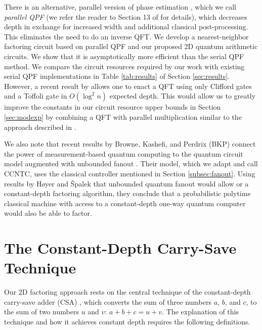 There is an alternative, parallel version of phase estimation 
\cite{Cleve2000,Kitaev2002}, which we call \emph{parallel QPF} (we refer the reader to Section 13 of \cite{Kitaev2002} for details), which decreases depth in exchange
for increased width and additional classical post-processing.
This eliminates the need to do an inverse QFT.
We develop a nearest-neighbor factoring circuit based on parallel QPF and our proposed 2D quantum arithmetic circuits.
We show that it is asymptotically more efficient than the serial QPF method. 
We compare the circuit resources required by our work with existing serial QPF implementations in Table
\ref{tab:results} of Section \ref{sec:results}.
However, a recent result by \cite{Jones2013} allows one to enact a
QFT using only Clifford gates and a Toffoli gate in $O(\log^2 n)$ expected depth.
This would allow us to
greatly improve the constants in our circuit resource upper bounds in Section \ref{sec:modexp} by combining a QFT with parallel multiplication similar to
the approach described in \cite{VanMeter2005,Cleve2000}.


We also note that recent results by Browne, Kashefi, and Perdrix (BKP) connect the power of
measurement-based quantum computing to the quantum circuit model augmented with
unbounded fanout \cite{Browne2009}. Their model, which we adapt and call
\textsc{CCNTC}, uses the classical controller mentioned in Section \ref{subsec:fanout}.
Using results by H{\o}yer and {\v S}palek \cite{Hoyer2002} that
unbounded quantum fanout would allow or a constant-depth factoring algorithm,
they conclude that a probabilistic polytime classical machine with access
to a constant-depth one-way quantum computer would also be able to factor.

%
\section{The Constant-Depth Carry-Save Technique}
\label{sec:csa}

Our 2D factoring approach rests on the central technique of the constant-depth
carry-save adder (CSA) \cite{Gossett1998}, which converts the sum of three
numbers $a$, $b$, and $c$, to the sum of two numbers $u$ and $v$:
$a+b+c = u+v$. The explanation of this technique and how it achieves constant depth requires the following definitions.

